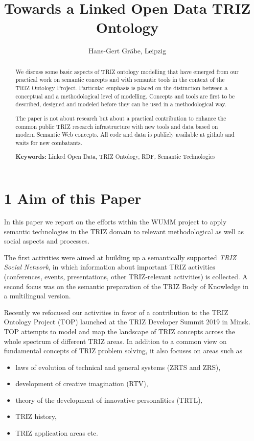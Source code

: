 \documentclass[12pt,a4paper]{article}
\title{Towards a Linked Open Data TRIZ Ontology}
\author{Hans-Gert Gräbe, Leipzig}
\begin{document}
\maketitle
\begin{abstract}
  We discuss some basic aspects of TRIZ ontology modelling that have emerged
  from our practical work on semantic concepts and with semantic tools in the
  context of the TRIZ Ontology Project. Particular emphasis is placed on the
  distinction between a conceptual and a methodological level of modelling.
  Concepts and tools are first to be described, designed and modeled before
  they can be used in a methodological way.
  
  The paper is not about research but about a practical contribution to
  enhance the common public TRIZ research infrastructure with new tools and
  data based on modern Semantic Web concepts. All code and data is publicly
  available at github \cite{25} and waits for new combatants.\bigskip

  \textbf{Keywords:} Linked Open Data, TRIZ Ontology, RDF, Semantic
  Technologies
\end{abstract}

\section*{1 Aim of this Paper}

In this paper we report on the efforts within the WUMM project \cite{26} to
apply semantic technologies in the TRIZ domain to relevant methodological as
well as social aspects and processes.

The first activities were aimed at building up a semantically supported
\emph{TRIZ Social Network}, in which information about important TRIZ
activities (conferences, events, presentations, other TRIZ-relevant
activities) is collected. A second focus was on the semantic preparation of
the TRIZ Body of Knowledge \cite{14,15} in a multilingual version.

Recently we refocused our activities in favor of a contribution to the TRIZ
Ontology Project (TOP) launched at the TRIZ Developer Summit 2019 in Minsk.
TOP attempts to model and map the landscape of TRIZ concepts across the whole
spectrum of different TRIZ areas. In addition to a common view on fundamental
concepts of TRIZ problem solving, it also focuses on areas such as
\begin{itemize}
 \item laws of evolution of technical and general systems (ZRTS and ZRS),
 \item development of creative imagination (RTV),
 \item theory of the development of innovative personalities (TRTL),
 \item TRIZ history,
 \item TRIZ application areas etc.
\end{itemize}
\end{document}
